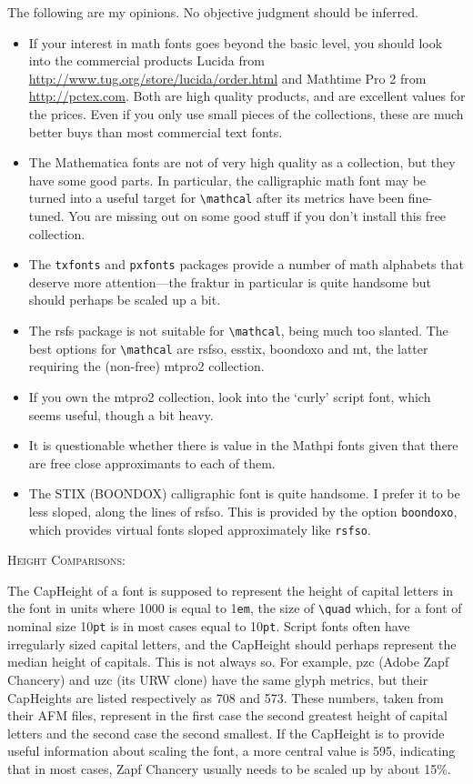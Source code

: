 \documentclass[11pt]{amsart}
\begin{document}
The following are my opinions. No objective judgment should be inferred.
\begin{itemize}
\item
If your interest in math fonts goes beyond the basic level, you should look into the commercial products \textsf{Lucida} from \url{http://www.tug.org/store/lucida/order.html} and \textsf{Mathtime Pro 2} from \url{http://pctex.com}. Both are high quality products, and are excellent values for the prices. Even if you only use small pieces of the collections, these are much better buys than most commercial text fonts.
\item 
The Mathematica fonts are not of very high quality as a collection, but they have some good parts. In particular, the calligraphic math font may be turned into a useful target for \verb|\mathcal| after its metrics have been fine-tuned.
 You are missing out on some good stuff if you don't install this free collection.
\item The {\tt txfonts} and {\tt pxfonts} packages provide a number of math alphabets that deserve more attention---the fraktur in particular is quite handsome but should perhaps be scaled up a bit.
\item
The \textsf{rsfs} package is not suitable for \verb|\mathcal|, being much too slanted. The best options for \verb|\mathcal| are \textsf{rsfso}, \textsf{esstix}, \textsf{boondoxo} and \textsf{mt}, the latter requiring the (non-free) \textsf{mtpro2} collection. 
\item
If you own the \textsf{mtpro2} collection, look into the `curly' script font, which seems useful, though a bit heavy.
\item It is questionable whether there is value in the \textsf{Mathpi} fonts given that there are free close approximants to each of them. 
\item The STIX (BOONDOX) calligraphic font is quite handsome. I  prefer it to be less sloped, along the lines of rsfso. This is provided by the option {\tt boondoxo}, which provides virtual fonts sloped approximately like {\tt rsfso}.
\end{itemize}

\textsc{Height Comparisons:}

The CapHeight of a font is supposed to represent the height of capital letters in the font in units where 1000 is equal to 1{\tt em}, the size of \verb|\quad| which, for a font of nominal size 10{\tt pt} is in most cases equal to 10{\tt pt}.  Script fonts often have irregularly sized capital letters, and the CapHeight should perhaps represent the median height of capitals. This is not always so. For example, \textsf{pzc} (Adobe Zapf Chancery) and \textsf{uzc} (its URW clone) have the same glyph metrics, but their CapHeights are listed respectively as 708 and 573. These numbers, taken from their AFM files, represent in the first case the second greatest height of  capital letters and the second case the second smallest. If the CapHeight is to provide useful information about scaling the font, a more central value is 595, indicating that in most cases, Zapf Chancery usually needs to be scaled up by about 15\%. 
\end{document}
